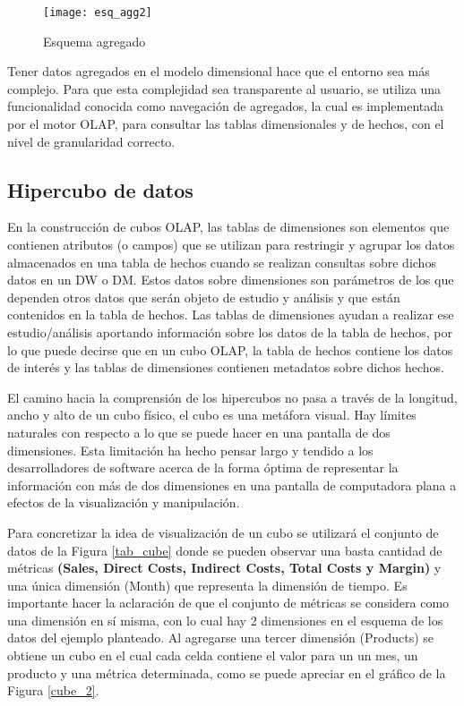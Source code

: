 \documentclass[a4paper,11pt]{article}
\begin{document}
\begin{flushleft}
    \begin{figure}
      \begin{center}
        \texttt{[image: esq\_agg2]}
        \caption{Esquema agregado} \cite{agg_tables}
        \label{sch_agg2}
      \end{center}
    \end{figure}
    
    Tener datos agregados en el modelo dimensional hace que el entorno sea más complejo. Para que esta complejidad sea transparente al usuario, se utiliza
    una funcionalidad conocida como navegación de agregados, la cual es implementada por el motor OLAP, para consultar las tablas dimensionales y de hechos,
    con el nivel de granularidad correcto.
    
    
    \subsection{Hipercubo de datos}
    
    En la construcción de cubos OLAP, las tablas de dimensiones son elementos que contienen atributos (o campos) que se utilizan para restringir y agrupar
    los datos almacenados en una tabla de hechos cuando se realizan consultas sobre dichos datos en un DW o DM. Estos datos sobre dimensiones son parámetros
    de los que dependen otros datos que serán objeto de estudio y análisis y que están contenidos en la tabla de hechos. Las tablas de dimensiones ayudan a
    realizar ese estudio/análisis aportando información sobre los datos de la tabla de hechos, por lo que puede decirse que en un cubo OLAP, la tabla de
    hechos contiene los datos de interés y las tablas de dimensiones contienen metadatos sobre dichos hechos.\par

    El camino hacia la comprensión de los hipercubos no pasa a través de la longitud, ancho y alto de un cubo físico, el cubo es una metáfora visual. Hay
    límites naturales con respecto a lo que se puede hacer en una pantalla de dos dimensiones. Esta limitación ha hecho pensar largo y tendido a los
    desarrolladores de software acerca de la forma óptima de representar la información con más de dos dimensiones en una pantalla de computadora plana a
    efectos de la visualización y manipulación.\par
    
    Para concretizar la idea de visualización de un cubo se utilizará el conjunto de datos de la Figura \ref{tab_cube} donde se pueden observar una basta cantidad de
    métricas \textbf{(Sales, Direct Costs, Indirect Costs, Total Costs y Margin)} y una única dimensión (Month) que representa la dimensión de tiempo. Es
    importante hacer la aclaración de que el conjunto de métricas se considera como una dimensión en sí misma, con lo cual hay 2 dimensiones en el esquema de
    los datos del ejemplo planteado. Al agregarse una tercer dimensión (Products) se obtiene un cubo en el cual cada celda contiene el valor para un un mes,
    un producto y una métrica determinada, como se puede apreciar en el gráfico de la Figura \ref{cube_2}.
    

\end{flushleft}
\end{document}
